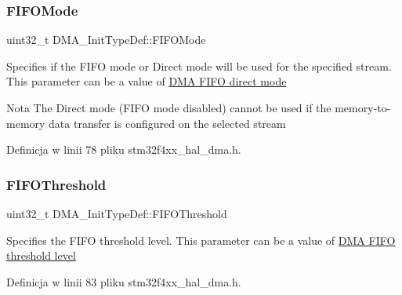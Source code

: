 \mbox{\label{struct_d_m_a___init_type_def_acda0396cf55baab166f51b1ea1deed0d}} 
\subsubsection{\texorpdfstring{F\+I\+F\+O\+Mode}{FIFOMode}}
{\footnotesize\ttfamily uint32\+\_\+t D\+M\+A\+\_\+\+Init\+Type\+Def\+::\+F\+I\+F\+O\+Mode}

Specifies if the F\+I\+FO mode or Direct mode will be used for the specified stream. This parameter can be a value of \hyperlink{group___d_m_a___f_i_f_o__direct__mode}{D\+MA F\+I\+FO direct mode} \begin{DoxyNote}{Nota}
The Direct mode (F\+I\+FO mode disabled) cannot be used if the memory-\/to-\/memory data transfer is configured on the selected stream 
\end{DoxyNote}


Definicja w linii 78 pliku stm32f4xx\+\_\+hal\+\_\+dma.\+h.

\mbox{\label{struct_d_m_a___init_type_def_a2f994cc2979b82cd215e9f38edbbc6ed}} 
\subsubsection{\texorpdfstring{F\+I\+F\+O\+Threshold}{FIFOThreshold}}
{\footnotesize\ttfamily uint32\+\_\+t D\+M\+A\+\_\+\+Init\+Type\+Def\+::\+F\+I\+F\+O\+Threshold}

Specifies the F\+I\+FO threshold level. This parameter can be a value of \hyperlink{group___d_m_a___f_i_f_o__threshold__level}{D\+MA F\+I\+FO threshold level} 

Definicja w linii 83 pliku stm32f4xx\+\_\+hal\+\_\+dma.\+h.

\mbox{\label{struct_d_m_a___init_type_def_ad5e266a0b90f58365e21c349654bc68d}} 
